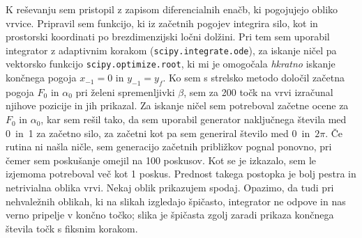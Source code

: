 K reševanju sem pristopil z zapisom diferencialnih enačb, ki pogojujejo obliko vrvice. Pripravil sem funkcijo, ki iz začetnih pogojev integrira silo, kot in prostorski koordinati po brezdimenzijski ločni dolžini. Pri tem sem uporabil integrator z adaptivnim korakom (\texttt{scipy.integrate.ode}), za iskanje ničel pa vektorsko funkcijo \texttt{scipy.optimize.root}, ki mi je omogočala \emph{hkratno} iskanje končnega pogoja $x_{-1} = 0$ in $y_{-1} = y_f$. Ko sem s strelsko metodo določil začetna pogoja $F_0$ in $\alpha_0$ pri želeni spremenljivki $\beta$, sem za 200 točk na vrvi izračunal njihove pozicije in jih prikazal. Za iskanje ničel sem potreboval začetne ocene za $F_0$ in $\alpha_0$, kar sem rešil tako, da sem uporabil generator naključnega števila med 0~in~1 za začetno silo, za začetni kot pa sem generiral število med 0~in~$2\pi$. Če rutina ni našla ničle, sem generacijo začetnih približkov pognal ponovno, pri čemer sem poskušanje omejil na 100 poskusov. Kot se je izkazalo, sem le izjemoma potreboval več kot 1 poskus. Prednost takega postopka je bolj pestra in netrivialna oblika vrvi. Nekaj oblik prikazujem spodaj. Opazimo, da tudi pri nehvaležnih oblikah, ki na slikah izgledajo špičasto, integrator ne odpove in nas verno pripelje v končno točko; slika je špičasta zgolj zaradi prikaza končnega števila točk s fiksnim korakom.


